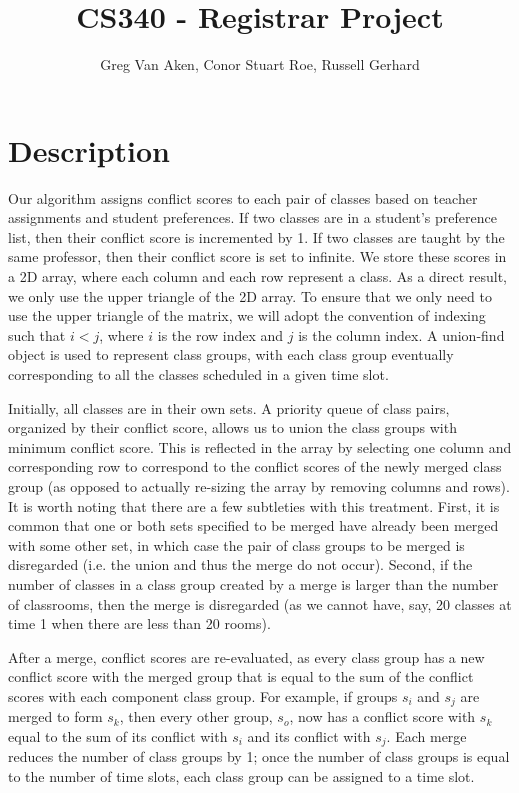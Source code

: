 \documentclass[11pt, oneside]{article}   	%
\title{CS340 - Registrar Project}
\author{Greg Van Aken, Conor Stuart Roe, Russell Gerhard}
\begin{document}
\maketitle

\section{Description}
Our algorithm assigns conflict scores to each pair of classes based on teacher assignments and student preferences. If two classes are in a student's preference list, then their conflict score is incremented by 1. If two classes are taught by the same professor, then their conflict score is set to infinite. We store these scores in a 2D array, where each column and each row represent a class. As a direct result, we only use the upper triangle of the 2D array. To ensure that we only need to use the upper triangle of the matrix, we will adopt the convention of indexing such that $i < j$, where $i$ is the row index and $j$ is the column index. A union-find object is used to represent class groups, with each class group eventually corresponding to all the classes scheduled in a given time slot.

Initially, all classes are in their own sets. A priority queue of class pairs, organized by their conflict score, allows us to union the class groups with minimum conflict score. This is reflected in the array by selecting one column and corresponding row to correspond to the conflict scores of the newly merged class group (as opposed to actually re-sizing the array by removing columns and rows). It is worth noting that there are a few subtleties with this treatment. First, it is common that one or both sets specified to be merged have already been merged with some other set, in which case the pair of class groups to be merged is disregarded (i.e. the union and thus the merge do not occur). Second, if the number of classes in a class group created by a merge is larger than the number of classrooms, then the merge is disregarded (as we cannot have, say, 20 classes at time 1 when there are less than 20 rooms).

After a merge, conflict scores are re-evaluated, as every class group has a new conflict score with the merged group that is equal to the sum of the conflict scores with each component class group. For example, if groups $s_i$ and $s_j$ are merged to form $s_k$, then every other group, $s_o$, now has a conflict score with $s_k$ equal to the sum of its conflict with $s_i$ and its conflict with $s_j$. Each merge reduces the number of class groups by 1; once the number of class groups is equal to the number of time slots, each class group can be assigned to a time slot.
\end{document}
